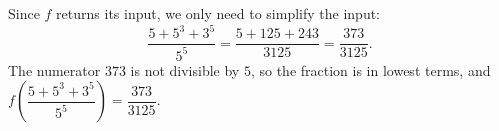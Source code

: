 Since $f$ returns its input, we only need to simplify the input:
\[\dfrac{5+5^3+3^5}{5^5}=\dfrac{5+125+243}{3125}=\dfrac{373}{3125}.\]
The numerator $373$ is not divisible by $5$, so the fraction is in lowest terms, and $f\left(\dfrac{5+5^3+3^5}{5^5}\right)=\boxed{\dfrac{373}{3125}}$.

